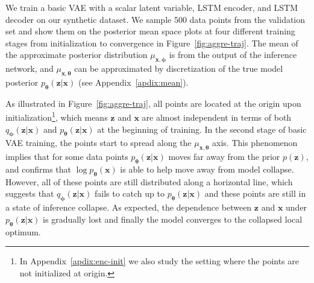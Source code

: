 \documentclass{article} \usepackage{iclr2019_conference,times}
\def\rvx{{\mathbf{x}}}
\def\rvz{{\mathbf{z}}}
\def\vtheta{{\bm{\theta}}}
\def\vphi{{\bm{\phi}}}
\newcommand{\qzx}{q_{\vphi}(\rvz|\rvx)}
\newcommand{\pzx}{p_{\vtheta}(\rvz|\rvx)}
\newcommand{\px}{p_{\vtheta}(\rvx)}
\newcommand{\pz}{p(\rvz)}
\newcommand{\z}{\rvz}
\newcommand{\x}{\rvx}
\newcommand{\mut}{\mu_{\x, \vtheta}}
\newcommand{\mup}{\mu_{\x, \vphi}}
\begin{document}
We train a basic VAE with a scalar latent variable, LSTM encoder, and LSTM decoder
on our synthetic dataset. We sample 500 data points from the validation set and show them on the posterior mean space plots at four different training stages from initialization to convergence in Figure~\ref{fig:aggre-traj}. The mean of the approximate posterior distribution $\mup$ is from the output of the inference network, and $\mut$ can be approximated by discretization of the true model posterior $\pzx$ (see Appendix~\ref{apdix:mean}).

As illustrated in Figure~\ref{fig:aggre-traj}, all points are located at the origin upon initialization\footnote{In Appendix~\ref{apdix:enc-init} we also study the setting where the points are not initialized at origin.}, which means $\z$ and $\x$ are almost independent in terms of both $\qzx$ and $\pzx$ at the beginning of training.
In the second stage of basic VAE training, the points start to spread along the $\mut$ axis. This phenomenon implies that for some data points $\pzx$ moves far away from the prior $\pz$, and confirms that $\log \px$ is able to help move away from model collapse.
However, all of these points are still distributed along a horizontal line, which suggests that $\qzx$ fails to catch up to $\pzx$ and these points are still in a state of inference collapse. As expected, the dependence between $\z$ and $\x$ under $\pzx$ is gradually lost and finally the model converges to the collapsed local optimum.
\end{document}

